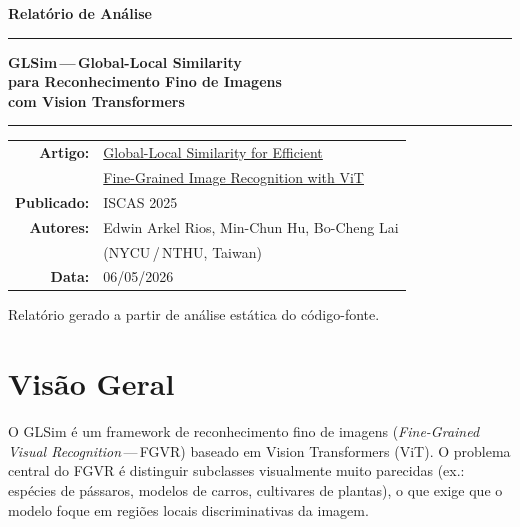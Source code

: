 \documentclass[a4paper,12pt]{scrartcl}
\begin{document}
\begin{titlepage}
  \centering
  \vspace*{2cm}
  {\Huge\bfseries Relat\'orio de An\'alise\par}
  \vspace{0.5cm}
  {\rule{\linewidth}{1.5pt}\par}
  \vspace{0.8cm}
  {\LARGE\bfseries GLSim\,---\,Global-Local Similarity\\[0.4em]
   para Reconhecimento Fino de Imagens\\[0.4em]
   com Vision Transformers\par}
  \vspace{0.8cm}
  {\rule{\linewidth}{1.5pt}\par}
  \vspace{1.5cm}

  \begin{tabular}{@{}rl@{}}
    \textbf{Artigo:}     & \href{https://arxiv.org/abs/2407.12891}{Global-Local Similarity for Efficient} \\
                         & \href{https://arxiv.org/abs/2407.12891}{Fine-Grained Image Recognition with ViT} \\[6pt]
    \textbf{Publicado:}  & ISCAS 2025 \\[6pt]
    \textbf{Autores:}    & Edwin Arkel Rios, Min-Chun Hu, Bo-Cheng Lai \\
                         & (NYCU\,/\,NTHU, Taiwan) \\[6pt]
    \textbf{Data:}       & 06/05/2026 \\
  \end{tabular}

  \vfill
  {\small Relat\'orio gerado a partir de an\'alise est\'atica do c\'odigo-fonte.}
\end{titlepage}

\tableofcontents
\clearpage

\section{Vis\~ao Geral}

O GLSim \'e um framework de reconhecimento fino de imagens
(\textit{Fine-Grained Visual Recognition}\,---\,FGVR) baseado em Vision
Transformers (ViT). O problema central do FGVR \'e distinguir subclasses
visualmente muito parecidas (ex.: esp\'ecies de p\'assaros, modelos de carros,
cultivares de plantas), o que exige que o modelo foque em regi\~oes locais
discriminativas da imagem.
\end{document}
